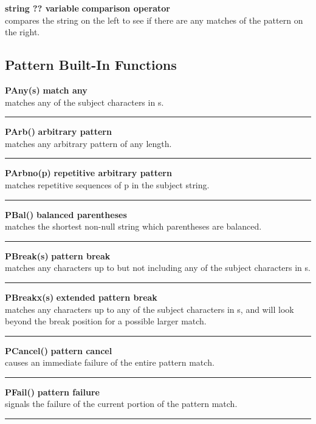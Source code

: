 \documentclass{article}
\begin{document}
\noindent\textbf{string ?? variable} \hfill\textbf{comparison operator}\\
compares the string on the left to see if there are any matches of the pattern on the right.\\

\subsection{Pattern Built-In Functions}
\noindent\textbf{PAny(s)} \hfill\textbf{match any}\\
matches any of the subject characters in s.\\
\noindent\rule{12cm}{0.1pt}

\noindent\textbf{PArb()} \hfill\textbf{arbitrary pattern}\\
matches any arbitrary pattern of any length.\\
\noindent\rule{12cm}{0.1pt}

\noindent\textbf{PArbno(p)} \hfill\textbf{repetitive arbitrary pattern}\\
matches repetitive sequences of p in the subject string.\\
\noindent\rule{12cm}{0.1pt}

\noindent\textbf{PBal()} \hfill\textbf{balanced parentheses}\\
matches the shortest non-null string which parentheses are balanced.\\
\noindent\rule{12cm}{0.1pt}

\noindent\textbf{PBreak(s)} \hfill\textbf{pattern break}\\
matches any characters up to but not including any of the subject characters in s.\\
\noindent\rule{12cm}{0.1pt}

\noindent\textbf{PBreakx(s)} \hfill\textbf{extended pattern break}\\
matches any characters up to any of the subject characters in s, and will look beyond the break position for a possible larger match.\\
\noindent\rule{12cm}{0.1pt}

\noindent\textbf{PCancel()} \hfill\textbf{pattern cancel}\\
causes an immediate failure of the entire pattern match.\\
\noindent\rule{12cm}{0.1pt}

\noindent\textbf{PFail()} \hfill\textbf{pattern failure}\\
signals the failure of the current portion of the pattern match.\\
\noindent\rule{12cm}{0.1pt}
\end{document}
